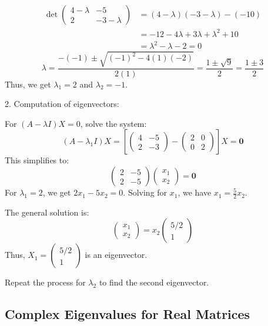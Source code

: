 \begin{align*}
    \det \begin{pmatrix}
        4 - \lambda & -5 \\
        2 & -3 - \lambda
        \end{pmatrix} &= (4-\lambda)(-3-\lambda) - (-10) \\
        &= -12 - 4\lambda + 3\lambda + \lambda^2 + 10 \\
        &= \lambda^2 - \lambda - 2 = 0
\end{align*}
\[
\lambda = \frac{-(-1) \pm \sqrt{(-1)^2 - 4(1)(-2)}}{2(1)} = \frac{1 \pm \sqrt{9}}{2} = \frac{1 \pm 3}{2}
\]
Thus, we get \(\lambda_1 = 2\) and \(\lambda_2 = -1\).

2. Computation of eigenvectors: \newline

For \((A - \lambda I)X = 0\), solve the system:
\[ (A - \lambda_1 I)X = \left[\begin{pmatrix} 4 & -5 \\ 2 & -3 \end{pmatrix} - \begin{pmatrix} 2 & 0 \\ 0 & 2 \end{pmatrix}\right] X = \mathbf{0} \]
This simplifies to:
\[
\begin{pmatrix}
2 & -5 \\
2 & -5
\end{pmatrix} \begin{pmatrix}
x_1 \\
x_2
\end{pmatrix} = \mathbf{0}
\]
For \(\lambda_1 = 2\), we get \(2x_1 - 5x_2 = 0\). Solving for \(x_1\), we have \(x_1 = \frac{5}{2} x_2\).

The general solution is:
\[
\begin{pmatrix}
x_1 \\
x_2
\end{pmatrix} = x_2 \begin{pmatrix}
5/2 \\
1
\end{pmatrix}
\]
Thus, \(X_1 = \begin{pmatrix}
5/2 \\
1
\end{pmatrix}\) is an eigenvector.

Repeat the process for \(\lambda_2\) to find the second eigenvector.
\subsection{Complex Eigenvalues for Real Matrices}

